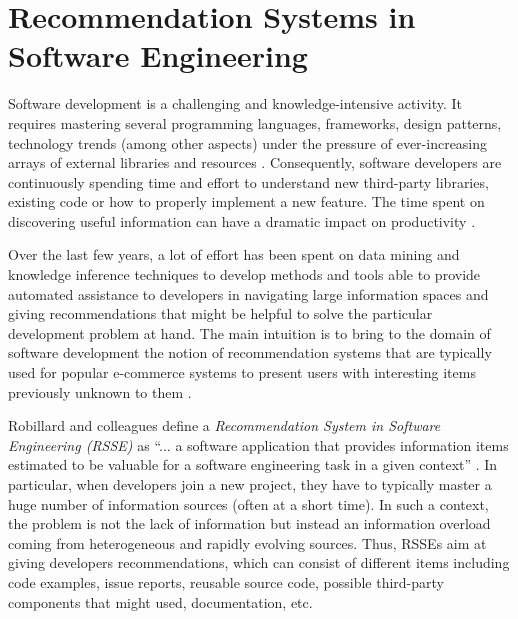 \section{Recommendation Systems in Software Engineering}



Software development is a challenging and knowledge-intensive activity. It 
requires mastering several programming languages, frameworks, design patterns, 
technology trends (among other aspects) under the pressure of ever-increasing 
arrays of external libraries and resources 
\cite{robillard_recommendation_2014}. Consequently, software developers are 
continuously spending time and effort to understand new third-party libraries, 
existing code or how to properly implement a new feature.  The time spent on 
discovering useful information can have a dramatic impact on productivity 
\cite{Duala-Ekoko:2012:AAQ:2337223.2337255}. 

Over the last few years, a lot of effort has been spent on data mining and 
knowledge inference techniques to develop methods and tools able to provide 
automated assistance to developers in navigating large information spaces and 
giving recommendations that might be helpful to solve the particular 
development problem at hand. The main intuition is to bring to the domain of 
software development the notion of recommendation systems that are typically 
used for popular e-commerce systems to present users with interesting items 
previously unknown to them \cite{Ricci2011}.

Robillard and colleagues define a \textit{Recommendation System in Software 
Engineering (RSSE)} as ``... a software application that provides information 
items estimated to be valuable for a
software engineering task in a given context'' 
\cite{robillard_recommendation_2014}. In particular, when developers join a new 
project, they have to typically master a huge number of information sources 
\cite{Dagenais:2010:MNS:1806799.1806842} (often at a short time). In such a 
context, the problem is not the lack of information but instead an information 
overload coming from heterogeneous and rapidly evolving sources.
Thus, RSSEs aim at giving developers recommendations, which can consist of 
different items including code examples, issue reports, reusable source code, 
possible third-party components that might used, documentation, etc. 

